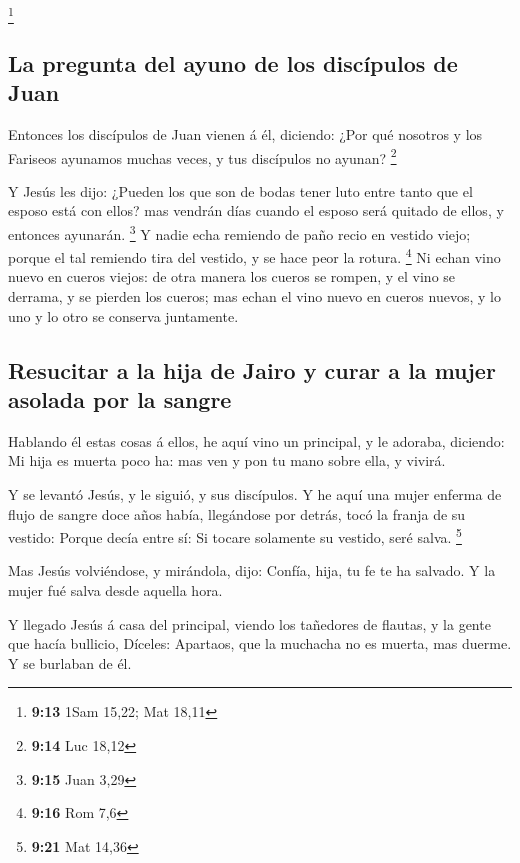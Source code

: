 \footnote{\textbf{9:13} 1Sam 15,22; Mat 18,11}

\hypertarget{la-pregunta-del-ayuno-de-los-discuxedpulos-de-juan}{%
\subsection{La pregunta del ayuno de los discípulos de
Juan}\label{la-pregunta-del-ayuno-de-los-discuxedpulos-de-juan}}

 Entonces los discípulos de Juan vienen á él, diciendo:
¿Por qué nosotros y los Fariseos ayunamos muchas veces, y tus discípulos
no ayunan? \footnote{\textbf{9:14} Luc 18,12}

 Y Jesús les dijo: ¿Pueden los que son de bodas tener luto
entre tanto que el esposo está con ellos? mas vendrán días cuando el
esposo será quitado de ellos, y entonces ayunarán. \footnote{\textbf{9:15}
  Juan 3,29}  Y nadie echa remiendo de paño recio en
vestido viejo; porque el tal remiendo tira del vestido, y se hace peor
la rotura. \footnote{\textbf{9:16} Rom 7,6}  Ni echan vino
nuevo en cueros viejos: de otra manera los cueros se rompen, y el vino
se derrama, y se pierden los cueros; mas echan el vino nuevo en cueros
nuevos, y lo uno y lo otro se conserva juntamente.

\hypertarget{resucitar-a-la-hija-de-jairo-y-curar-a-la-mujer-asolada-por-la-sangre}{%
\subsection{Resucitar a la hija de Jairo y curar a la mujer asolada por
la
sangre}\label{resucitar-a-la-hija-de-jairo-y-curar-a-la-mujer-asolada-por-la-sangre}}

 Hablando él estas cosas á ellos, he aquí vino un
principal, y le adoraba, diciendo: Mi hija es muerta poco ha: mas ven y
pon tu mano sobre ella, y vivirá.

 Y se levantó Jesús, y le siguió, y sus discípulos.
 Y he aquí una mujer enferma de flujo de sangre doce años
había, llegándose por detrás, tocó la franja de su vestido:
 Porque decía entre sí: Si tocare solamente su vestido,
seré salva. \footnote{\textbf{9:21} Mat 14,36}

 Mas Jesús volviéndose, y mirándola, dijo: Confía, hija, tu
fe te ha salvado. Y la mujer fué salva desde aquella hora.

 Y llegado Jesús á casa del principal, viendo los tañedores
de flautas, y la gente que hacía bullicio,  Díceles:
Apartaos, que la muchacha no es muerta, mas duerme. Y se burlaban de él.

